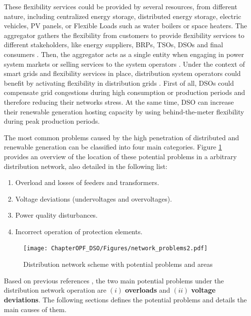 These flexibility services could be provided by several resources, from different nature, including centralized energy storage, distributed energy storage, electric vehicles, PV panels, or Flexible Loads such as water boilers or space heaters. The aggregator gathers the flexibility from customers to provide flexibility services to different stakeholders, like energy suppliers, BRPs, TSOs, DSOs and final consumers \cite{USEFFoundation2015a, Olivella2018}. Then, the aggregator acts as a single entity when engaging in power system markets or selling services to the system operators \cite{BURGER2017}. Under the context of smart grids and flexibility services in place, distribution system operators could benefit by activating flexibility in distribution grids \cite{USEFFoundation2015a, spiliotis2016demand, esmat2016conf, hashemi2016}. First of all, DSOs could compensate grid congestions during high consumption or production periods and therefore reducing their networks stress. At the same time, DSO can increase their renewable generation hosting capacity by using behind-the-meter flexibility during peak production periods. 

The most common problems caused by the high penetration of distributed and renewable generation can be classified into four main categories. Figure \ref{fig:network_problems} provides an overview of the location of these potential problems in a arbitrary distribution network, also detailed in the following list:  

\begin{enumerate}
\item Overload and losses of feeders and transformers. 
\item Voltage deviations (undervoltages and overvoltages).
\item Power quality disturbances.
\item Incorrect operation of protection elements. 
\end{enumerate}

\begin{figure}[h]
	\centering
	\texttt{[image: ChapterOPF\_DSO/Figures/network\_problems2.pdf]}
		\caption{Distribution network scheme with potential problems and areas}
	\label{fig:network_problems}  
\end{figure}

Based on previous references \cite{ISMAEL20191002, Bollen2011}, the two main potential problems under the distribution network operation are $(i)$ \textbf{overloads} and  $(ii)$ \textbf{voltage deviations}. The following sections defines the potential problems and details the main causes of them. 


